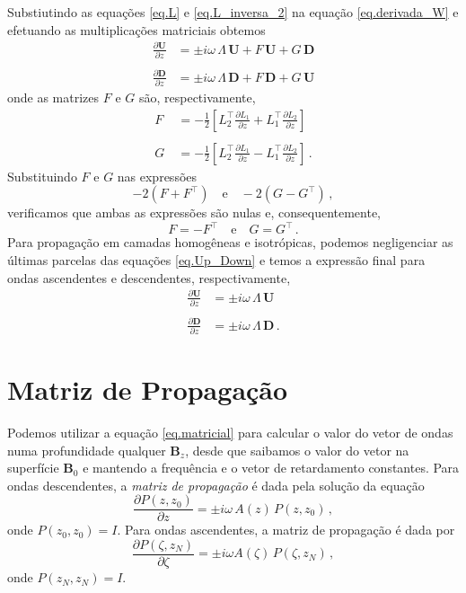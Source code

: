 Substiutindo as equa\c{c}\~oes \ref{eq.L} e \ref{eq.L_inversa_2} na equa\c{c}\~ao \ref{eq.derivada_W} e efetuando as multiplica\c{c}\~oes matriciais obtemos
\begin{align}\label{eq.Up_Down}\nonumber
\frac{\partial\mathbf{U}}{\partial z}&=\pm i\omega\,\Lambda\,\mathbf{U}+F\,\mathbf{U}+G\,\mathbf{D}\\\quad\\\nonumber
\frac{\partial\mathbf{D}}{\partial z}&=\pm i\omega\,\Lambda\,\mathbf{D}+F\,\mathbf{D}+G\,\mathbf{U}
\end{align}
onde as matrizes $F$ e $G$ s\~ao, respectivamente,
\begin{align*}
F&=-\frac{1}{2}\left[L_2^\top\frac{\partial L_1}{\partial z}+L_1^\top\frac{\partial L_2}{\partial z}\right]\\\quad\\
G&=-\frac{1}{2}\left[L_2^\top\frac{\partial L_1}{\partial z}-L_1^\top\frac{\partial L_2}{\partial z}\right]\,.
\end{align*}
Substituindo $F$ e $G$ nas express\~oes
\begin{equation*}
-2(F+F^\top)\quad\text{e}\quad-2(G-G^\top)\,,
\end{equation*}
verificamos que ambas as express\~oes s\~ao nulas e, consequentemente,
\begin{equation*}
F=-F^\top\quad\text{e}\quad G=G^\top\,.
\end{equation*}
Para propaga\c{c}\~ao em camadas homog\^eneas e isotr\'opicas, podemos  negligenciar as \'ultimas parcelas das equa\c{c}\~oes \ref{eq.Up_Down} e temos a express\~ao final para ondas ascendentes e descendentes, respectivamente,
\begin{align}\label{eq.Up_Down_2}\nonumber
\frac{\partial\mathbf{U}}{\partial z}&=\pm i\omega\,\Lambda\,\mathbf{U}\\\quad\\\nonumber
\frac{\partial\mathbf{D}}{\partial z}&=\pm i\omega\,\Lambda\,\mathbf{D}\,.
\end{align}


\section{Matriz de Propaga\c{c}\~ao}

Podemos utilizar a equa\c{c}\~ao \ref{eq.matricial} para calcular o valor do vetor de ondas numa profundidade qualquer $\mathbf{B}_z$, desde que saibamos o valor do vetor na superf\'icie $\mathbf{B}_0$ e mantendo a frequ\^encia e o vetor de retardamento constantes. Para ondas descendentes, a \textit{matriz de propaga\c{c}\~ao} \'e dada pela solu\c{c}\~ao da equa\c{c}\~ao 
\begin{equation}\label{eq.matriz_propagacao}
\frac{\partial P(z,z_0)}{\partial z}=\pm i\omega\,A(z)\,P(z,z_0)\,,
\end{equation}
onde $P(z_0,z_0)=I$. Para ondas ascendentes, a matriz de propaga\c{c}\~ao \'e dada por
\begin{equation*}
\frac{\partial P(\zeta,z_N)}{\partial \zeta}=\pm i\omega A(\zeta)\,P(\zeta,z_N)\,,
\end{equation*}
onde $P(z_N,z_N)=I$.

